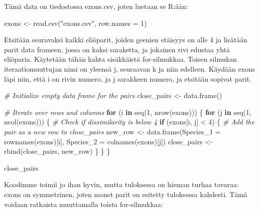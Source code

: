 \documentclass[
]{book}
\newenvironment{Shaded}{\begin{snugshade}}{\end{snugshade}}
\newcommand{\AttributeTok}[1]{\textcolor[rgb]{0.77,0.63,0.00}{#1}}
\newcommand{\CommentTok}[1]{\textcolor[rgb]{0.56,0.35,0.01}{\textit{#1}}}
\newcommand{\ControlFlowTok}[1]{\textcolor[rgb]{0.13,0.29,0.53}{\textbf{#1}}}
\newcommand{\DecValTok}[1]{\textcolor[rgb]{0.00,0.00,0.81}{#1}}
\newcommand{\FunctionTok}[1]{\textcolor[rgb]{0.00,0.00,0.00}{#1}}
\newcommand{\NormalTok}[1]{#1}
\newcommand{\OtherTok}[1]{\textcolor[rgb]{0.56,0.35,0.01}{#1}}
\newcommand{\SpecialCharTok}[1]{\textcolor[rgb]{0.00,0.00,0.00}{#1}}
\newcommand{\StringTok}[1]{\textcolor[rgb]{0.31,0.60,0.02}{#1}}
\begin{document}
Tämä data on tiedostossa exons.csv, joten luetaan se R:ään:

\begin{Shaded}
\begin{Highlighting}[]
\NormalTok{exons }\OtherTok{\textless{}{-}} \FunctionTok{read.csv}\NormalTok{(}\StringTok{"exons.csv"}\NormalTok{, }\AttributeTok{row.names =} \DecValTok{1}\NormalTok{)}
\end{Highlighting}
\end{Shaded}

Etsitään seuravaksi kaikki eliöparit, joiden geenien etäisyys on alle 4 ja lisätään parit data frameen, jossa on kaksi saraketta, ja jokainen rivi edustaa yhtä eliöparia. Käytetään tähän kahta sisäkkäistä for-silmukkaa. Toisen silmukan iteraatiomuuttujan nimi on yleensä j, seuraavan k ja niin edelleen. Käydään exons läpi niin, että i on rivin numero, ja j sarakkeen numero, ja etsitään sopivat parit.

\begin{Shaded}
\begin{Highlighting}[]
\CommentTok{\# Initialize empty data frame for the pairs}
\NormalTok{close\_pairs }\OtherTok{\textless{}{-}} \FunctionTok{data.frame}\NormalTok{()}

\CommentTok{\# Iterate over rows and columns}
\ControlFlowTok{for}\NormalTok{ (i }\ControlFlowTok{in} \FunctionTok{seq}\NormalTok{(}\DecValTok{1}\NormalTok{, }\FunctionTok{nrow}\NormalTok{(exons))) \{}
  \ControlFlowTok{for}\NormalTok{ (j }\ControlFlowTok{in} \FunctionTok{seq}\NormalTok{(}\DecValTok{1}\NormalTok{, }\FunctionTok{ncol}\NormalTok{(exons))) \{}
    \CommentTok{\# Check if dissimilarity is below 4}
    \ControlFlowTok{if}\NormalTok{ (exons[i, j] }\SpecialCharTok{\textless{}} \DecValTok{4}\NormalTok{) \{}
      \CommentTok{\# Add the pair as a new row to close\_pairs}
\NormalTok{      new\_row }\OtherTok{\textless{}{-}} \FunctionTok{data.frame}\NormalTok{(}\AttributeTok{Species\_1 =} \FunctionTok{rownames}\NormalTok{(exons)[i],}
                            \AttributeTok{Species\_2 =} \FunctionTok{colnames}\NormalTok{(exons)[j])}
\NormalTok{      close\_pairs }\OtherTok{\textless{}{-}} \FunctionTok{rbind}\NormalTok{(close\_pairs,}
\NormalTok{                           new\_row)}
\NormalTok{    \}}
\NormalTok{  \}}
\NormalTok{\}}

\NormalTok{close\_pairs}
\end{Highlighting}
\end{Shaded}

Koodimme toimii jo ihan hyvin, mutta tuloksessa on hieman turhaa tavaraa: exons on symmetrinen, joten monet parit on esitetty tuloksessa kahdesti. Tämä voidaan ratkaista muuttamalla toista for-silmukkaa:
\end{document}
